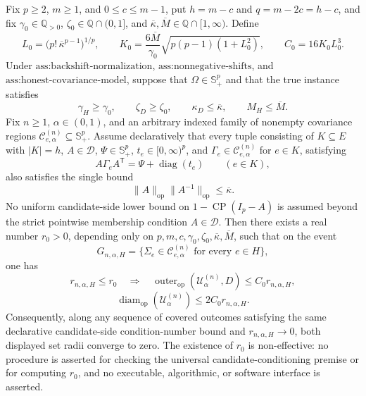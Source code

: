 Fix \(p\geq2\), \(m\geq1\), and \(0\leq c\leq m-1\), put \(h=m-c\) and \(q=m-2c=h-c\), and fix \(\gamma_0\in\mathbb Q_{>0}\), \(\zeta_0\in\mathbb Q\cap(0,1]\), and \(\overline\kappa,\overline M\in\mathbb Q\cap[1,\infty)\). Define
\[
L_0=\bigl(p!\,\overline\kappa^{p-1}\bigr)^{1/p},
\qquad
K_0=\frac{6\overline M}{\gamma_0}
\sqrt{p(p-1)(1+L_0^2)},
\qquad
C_0=16K_0L_0^3.
\]
Under \(\text{ass:backshift-normalization}\), \(\text{ass:nonnegative-shifts}\), and \(\text{ass:honest-covariance-model}\), suppose that \(\Omega\in\mathbb S_+^p\) and that the true instance satisfies
\[
\gamma_H\geq\gamma_0,\qquad
\zeta_D\geq\zeta_0,\qquad
\kappa_D\leq\overline\kappa,\qquad
M_H\leq\overline M.
\]
Fix \(n\geq1\), \(\alpha\in(0,1)\), and an arbitrary indexed family of nonempty covariance regions \(\mathcal C^{(n)}_{e,\alpha}\subseteq\mathbb S_{+}^p\). Assume declaratively that every tuple consisting of \(K\subseteq E\) with \(|K|=h\), \(A\in\mathcal D\), \(\Psi\in\mathbb S_+^p\), \(t_e\in[0,\infty)^p\), and \(\Gamma_e\in\mathcal C^{(n)}_{e,\alpha}\) for \(e\in K\), satisfying
\[
A\Gamma_eA^{\mathsf T}=\Psi+\operatorname{diag}(t_e)
\qquad(e\in K),
\]
also satisfies the single bound
\[
\|A\|_{\mathrm{op}}\|A^{-1}\|_{\mathrm{op}}
\leq\overline\kappa.
\]
No uniform candidate-side lower bound on \(1-\operatorname{CP}(I_p-A)\) is assumed beyond the strict pointwise membership condition \(A\in\mathcal D\). Then there exists a real number \(r_0>0\), depending only on \(p,m,c,\gamma_0,\zeta_0,\overline\kappa,\overline M\), such that on the event
\[
G_{n,\alpha,H}
=\{\Sigma_e\in\mathcal C^{(n)}_{e,\alpha}\text{ for every }e\in H\},
\]
one has
\[
r_{n,\alpha,H}\leq r_0
\quad\Longrightarrow\quad
\operatorname{outer}_{\mathrm{op}}(\mathcal U^{(n)}_\alpha,D)
\leq C_0r_{n,\alpha,H},
\]
\[
\operatorname{diam}_{\mathrm{op}}(\mathcal U^{(n)}_\alpha)
\leq2C_0r_{n,\alpha,H}.
\]
Consequently, along any sequence of covered outcomes satisfying the same declarative candidate-side condition-number bound and \(r_{n,\alpha,H}\to0\), both displayed set radii converge to zero. The existence of \(r_0\) is non-effective: no procedure is asserted for checking the universal candidate-conditioning premise or for computing \(r_0\), and no executable, algorithmic, or software interface is asserted.
